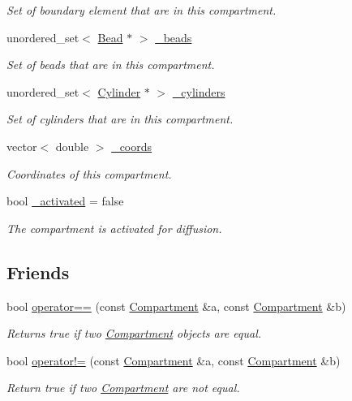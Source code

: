 \begin{DoxyCompactItemize}
\begin{DoxyCompactList}\small\item\em Set of boundary element that are in this compartment. \end{DoxyCompactList}\item 
unordered\+\_\+set$<$ \hyperlink{classBead}{Bead} $\ast$ $>$ \hyperlink{classCompartment_a9da94d9a1b486007a4572865dcfcd474}{\+\_\+beads}
\begin{DoxyCompactList}\small\item\em Set of beads that are in this compartment. \end{DoxyCompactList}\item 
unordered\+\_\+set$<$ \hyperlink{classCylinder}{Cylinder} $\ast$ $>$ \hyperlink{classCompartment_aa2ff682579186097ddf444b3dafb1370}{\+\_\+cylinders}
\begin{DoxyCompactList}\small\item\em Set of cylinders that are in this compartment. \end{DoxyCompactList}\item 
vector$<$ double $>$ \hyperlink{classCompartment_a065b6c2a3018b3de7404f56819908d2e}{\+\_\+coords}
\begin{DoxyCompactList}\small\item\em Coordinates of this compartment. \end{DoxyCompactList}\item 
bool \hyperlink{classCompartment_a5a4d3757d80d9ffce75c4012a64962a8}{\+\_\+activated} = false
\begin{DoxyCompactList}\small\item\em The compartment is activated for diffusion. \end{DoxyCompactList}\end{DoxyCompactItemize}
\subsection*{Friends}
\begin{DoxyCompactItemize}
\item 
bool \hyperlink{classCompartment_ab45e5038a170f915298923d7a658ee8c}{operator==} (const \hyperlink{classCompartment}{Compartment} \&a, const \hyperlink{classCompartment}{Compartment} \&b)
\begin{DoxyCompactList}\small\item\em Returns true if two \hyperlink{classCompartment}{Compartment} objects are equal. \end{DoxyCompactList}\item 
bool \hyperlink{classCompartment_a0809c1fc222c0157f44da8e41b01c09a}{operator!=} (const \hyperlink{classCompartment}{Compartment} \&a, const \hyperlink{classCompartment}{Compartment} \&b)
\begin{DoxyCompactList}\small\item\em Return true if two \hyperlink{classCompartment}{Compartment} are not equal. \end{DoxyCompactList}\end{DoxyCompactItemize}


